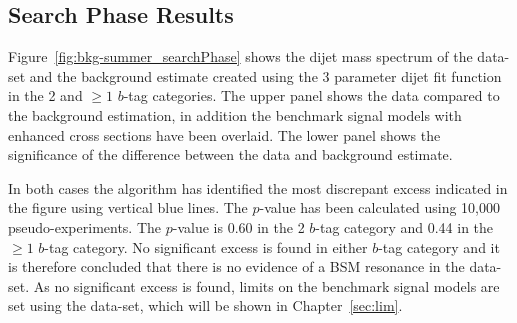 \clearpage

\subsection{Search Phase Results}
\label{sec:bkg-summer_results}

Figure~\ref{fig:bkg-summer_searchPhase} shows the dijet mass spectrum of the
\summer{} data-set and the background estimate created using the 3 parameter dijet fit function
in the 2 and $\geq1$ $b$-tag categories.
The upper panel shows the data compared to the background estimation,
in addition the benchmark signal models with enhanced cross sections have been overlaid.
The lower panel shows the significance of the difference between the data and background estimate.

In both cases the \bh{} algorithm has identified the most discrepant excess indicated
in the figure using vertical blue lines.
The \bh{} \mbox{$p$-value} has been calculated using 10,000 pseudo-experiments.
The \bh{} \mbox{$p$-value} is 0.60 in the 2 $b$-tag category
and 0.44 in the $\geq1$ $b$-tag category.
No significant excess is found in either $b$-tag category and it is therefore concluded
that there is no evidence of a BSM resonance in the \summer{} data-set.
As no significant excess is found, limits on the benchmark signal models are set using the \summer{} data-set,
which will be shown in Chapter~\ref{sec:lim}.


